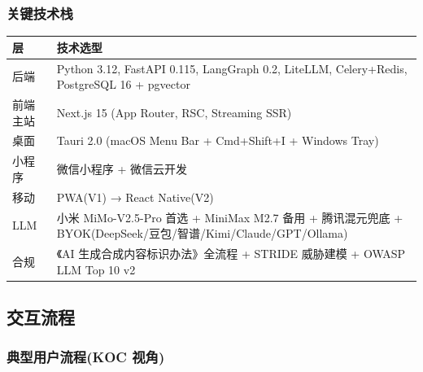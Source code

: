 \subsubsection{关键技术栈}

\begin{tabularx}{\textwidth}{lX}
\toprule
\textbf{层} & \textbf{技术选型} \\
\midrule
后端 & Python 3.12, FastAPI 0.115, LangGraph 0.2, LiteLLM, Celery+Redis, PostgreSQL 16 + pgvector \\
前端主站 & Next.js 15 (App Router, RSC, Streaming SSR) \\
桌面 & Tauri 2.0 (macOS Menu Bar + Cmd+Shift+I + Windows Tray) \\
小程序 & 微信小程序 + 微信云开发 \\
移动 & PWA(V1) → React Native(V2) \\
LLM & 小米 MiMo-V2.5-Pro 首选 + MiniMax M2.7 备用 + 腾讯混元兜底 + BYOK(DeepSeek/豆包/智谱/Kimi/Claude/GPT/Ollama) \\
合规 & 《AI 生成合成内容标识办法》全流程 + STRIDE 威胁建模 + OWASP LLM Top 10 v2 \\
\bottomrule
\end{tabularx}

\subsection{交互流程}

\subsubsection{典型用户流程(KOC 视角)}

